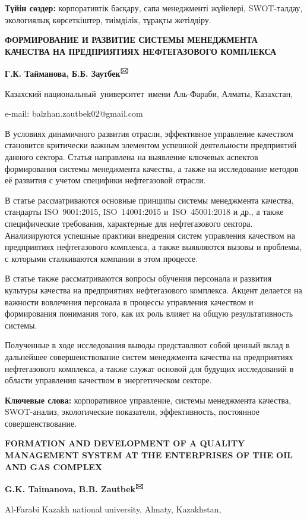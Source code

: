 {\bfseries Түйін сөздер:} корпоративтік басқару, сапа менеджменті жүйелері,
SWOT-талдау, экологиялық көрсеткіштер, тиімділік, тұрақты жетілдіру.

{\bfseries ФОРМИРОВАНИЕ И РАЗВИТИЕ СИСТЕМЫ МЕНЕДЖМЕНТА КАЧЕСТВА НА
ПРЕДПРИЯТИЯХ НЕФТЕГАЗОВОГО КОМПЛЕКСА}

{\bfseries Г.К. Тайманова, Б.Б. Заутбек\textsuperscript{🖂}}

Казахский национальный~университет~имени Аль-Фараби, Алматы, Казахстан,

e-mail: balzhan.zautbek02@gmail.com

В условиях динамичного развития отрасли, эффективное управление
качеством становится критически важным элементом успешной деятельности
предприятий данного сектора. Статья направлена на выявление ключевых
аспектов формирования системы менеджмента качества, а также на
исследование методов её развития с учетом специфики нефтегазовой
отрасли.

В статье рассматриваются основные принципы системы менеджмента качества,
стандарты ISO~9001:2015, ISO~14001:2015 и~ISO~45001:2018 и др., а также
специфические требования, характерные для нефтегазового сектора.
Анализируются успешные практики внедрения систем управления качеством на
предприятиях нефтегазового комплекса, а также выявляются вызовы и
проблемы, с которыми сталкиваются компании в этом процессе.

В статье также рассматриваются вопросы обучения персонала и развития
культуры качества на предприятиях нефтегазового комплекса. Акцент
делается на важности вовлечения персонала в процессы управления
качеством и формирования понимания того, как их роль влияет на общую
результативность системы.

Полученные в ходе исследования выводы представляют собой ценный вклад в
дальнейшее совершенствование систем менеджмента качества на предприятиях
нефтегазового комплекса, а также служат основой для будущих исследований
в области управления качеством в энергетическом секторе.

{\bfseries Ключевые слова:} корпоративное управление, системы менеджмента
качества, SWOT-анализ, экологические показатели, эффективность,
постоянное совершенствование.

{\bfseries FORMATION AND DEVELOPMENT OF A QUALITY MANAGEMENT SYSTEM AT THE
ENTERPRISES OF THE OIL AND GAS COMPLEX}

{\bfseries G.K. Taimanova, B.B. Zautbek\textsuperscript{🖂}}

Al-Farabi Kazakh national university, Almaty, Kazakhstan,

